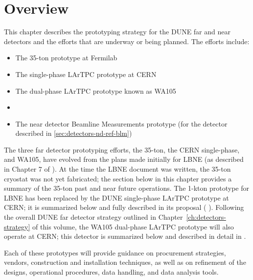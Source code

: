 \section{Overview}
\label{sec:proto-overview}


This chapter describes the prototyping strategy for the DUNE  far and near detectors and the efforts that are underway or being planned.  The efforts include:

\begin{itemize}
\item The 35-ton prototype at Fermilab
\item The single-phase LArTPC prototype at CERN
\item The dual-phase LArTPC prototype known as WA105 
\item {}
\item The near detector Beamline Measurements prototype (for the detector described in \ref{sec:detectors-nd-ref-blm})
\end{itemize}

The three far detector prototyping efforts, the 35-ton, the CERN
single-phase, and WA105, have evolved from the plans made initially
for LBNE (as described in Chapter 7 of \anxlbnefd ).  At the time the
LBNE document was written, the 35-ton cryostat was not yet fabricated;
the section below in this chapter provides a summary of the 35-ton
past and near future operations.  The 1-kton prototype for LBNE has
been replaced by the DUNE single-phase LArTPC prototype at CERN; it is
summarized below and fully described in its proposal (\anxcernproto
).  Following the overall DUNE far detector strategy outlined in
Chapter~\ref{ch:detectors-strategy} of this volume, the WA105
dual-phase LArTPC prototype will also operate at CERN; this detector
is summarized below and described in detail in \anxdualtdr .


Each of these prototypes will provide guidance on procurement
strategies, vendors, construction and installation techniques, as well
as on refinement of the designs, operational procedures, data handling,
and data analysis tools.
